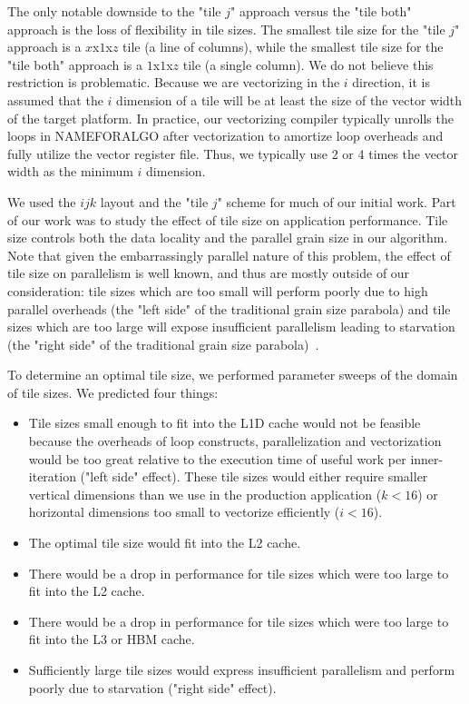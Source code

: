 \documentclass[conference]{IEEEtran}
\begin{document}
The only notable downside to the "tile \(j\)" approach versus the "tile both"
approach is the loss of flexibility in tile sizes. The smallest tile size for
the "tile \(j\)" approach is a \(x\)x\(1\)x\(z\) tile (a line of columns),
while the smallest tile size for the "tile both" approach is a
\(1\)x\(1\)x\(z\) tile (a single column). We do not believe this restriction is
problematic. Because we are vectorizing in the \(i\) direction, it is assumed
that the \(i\) dimension of a tile will be at least the size of the vector
width of the target platform. In practice, our vectorizing compiler typically
unrolls the loops in NAMEFORALGO after vectorization to amortize loop overheads
and fully utilize the vector register file. Thus, we typically use 2 or 4 times
the vector width as the minimum \(i\) dimension. 

We used the \(ijk\) layout and the "tile \(j\)" scheme for much of our initial
work. Part of our work was to study the effect of tile size on application
performance.  Tile size controls both the data locality and the parallel grain
size in our algorithm. Note that given the embarrassingly parallel nature of
this problem, the effect of tile size on parallelism is well known, and thus
are mostly outside of our consideration: tile sizes which are too small will
perform poorly due to high parallel overheads (the "left side" of the
traditional grain size parabola) and tile sizes which are too large will expose
insufficient parallelism leading to starvation (the "right side" of the
traditional grain size parabola)~\cite{some_parallex_thing}.

To determine an optimal tile size, we performed parameter sweeps of the domain
of tile sizes. We predicted four things:

\begin{itemize}
\item Tile sizes small enough to fit into the L1D cache would not be feasible
because the overheads of loop constructs, parallelization and vectorization
would be too great relative to the execution time of useful work per
inner-iteration ("left side" effect). These tile sizes would either require
smaller vertical dimensions than we use in the production application (\(k <
16\)) or horizontal dimensions too small to vectorize efficiently (\(i < 16\)).
\item The optimal tile size would fit into the L2 cache.
\item There would be a drop in performance for tile sizes which were too large to fit into the L2 cache.
\item There would be a drop in performance for tile sizes which were too large to fit into the L3 or HBM cache.
\item Sufficiently large tile sizes would express insufficient parallelism and
perform poorly due to starvation ("right side" effect).
\end{itemize}
\end{document}
